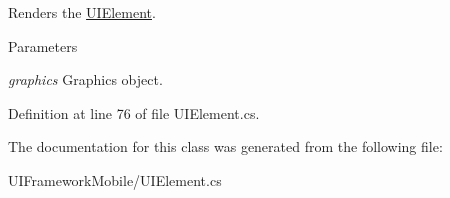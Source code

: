 Renders the \hyperlink{class_msdn_1_1_u_i_framework_1_1_u_i_element}{UIElement}. 
\begin{DoxyParams}{Parameters}
\item[{\em graphics}]Graphics object.\end{DoxyParams}


Definition at line 76 of file UIElement.cs.

The documentation for this class was generated from the following file:\begin{DoxyCompactItemize}
\item 
UIFrameworkMobile/UIElement.cs\end{DoxyCompactItemize}
